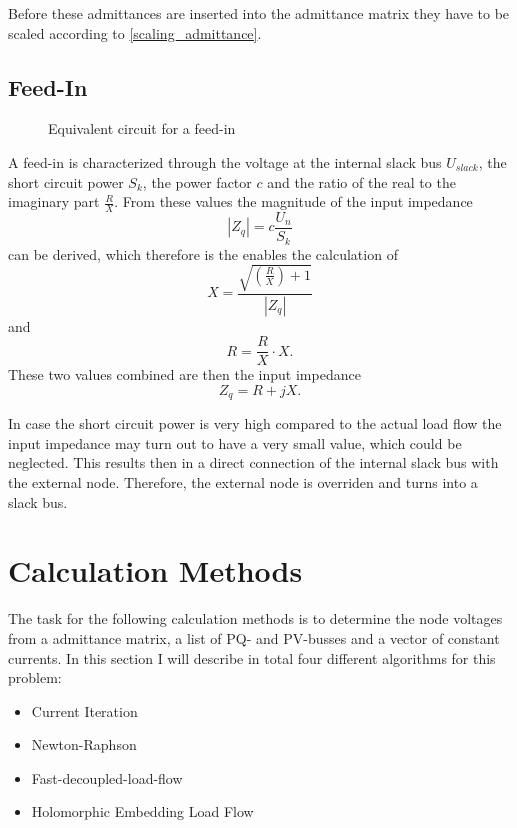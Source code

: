 Before these admittances are inserted into the admittance matrix they have to be scaled according to \eqref{scaling_admittance}.

\subsection{Feed-In}

\begin{figure}
	\centering
	
	\caption{Equivalent circuit for a feed-in}
	\label{fig:feedin}
\end{figure}

A feed-in  is characterized through the voltage at the internal slack bus $U_{slack}$, the short circuit power $S_k$, the power factor $c$ and the ratio of the real to the imaginary part $\frac{R}{X}$. From these values the magnitude of the input impedance 
\begin{equation}
	|Z_q| = c \frac{U_n}{S_k}
\end{equation}
can be derived, which therefore is the enables the calculation of
\begin{equation}
	X = \frac{\sqrt{\left( \frac{R}{X} \right) + 1}}{|Z_q|}
\end{equation}
and
\begin{equation}
	R = \frac{R}{X} \cdot X.
\end{equation}
These two values combined are then the input impedance
\begin{equation}
	Z_q = R + j X.
\end{equation}

In case the short circuit power is very high compared to the actual load flow the input impedance may turn out to have a very small value, which could be neglected. This results then in a direct connection of the internal slack bus with the external node. Therefore, the external node is overriden and turns into a slack bus.

\section{Calculation Methods}

The task for the following calculation methods is to determine the node voltages from a admittance matrix, a list of PQ- and PV-busses and a vector of constant currents. In this section I will describe in total four different algorithms for this problem:
\begin{itemize}
	\item Current Iteration \citep[p. 209]{powerSystemAnalysis}
	\item Newton-Raphson \citep[p. 232]{powerSystemAnalysis}
	\item Fast-decoupled-load-flow \citep[p. 240]{powerSystemAnalysis}
	\item Holomorphic Embedding Load Flow \citep{helmIEEE, helmPatentApr2009, helmPatentSept2009}
\end{itemize}

